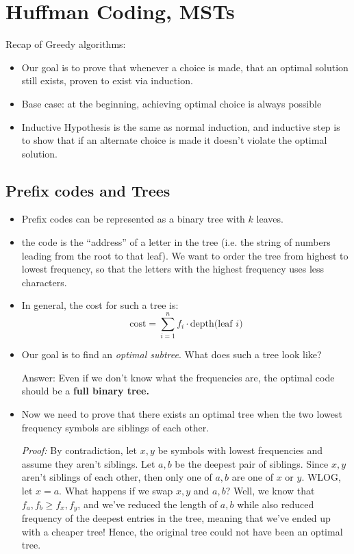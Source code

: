 \section{Huffman Coding, MSTs}
	Recap of Greedy algorithms:
	\begin{itemize}
		\item Our goal is to prove that whenever a choice is made, that an optimal solution still exists, proven
			to exist via induction.
		\item Base case: at the beginning, achieving optimal choice is always possible
		\item Inductive Hypothesis is the same as normal induction, and inductive step is to show that if 
			an alternate choice is made it doesn't violate the optimal solution.
	\end{itemize}
	\subsection{Prefix codes and Trees}
	\begin{itemize}
		\item Prefix codes can be represented as a binary tree with $k$ leaves. 
		\item the code is the ``address'' of a letter in the tree (i.e. the string of numbers leading from 
			the root to that leaf). We want to order the tree from highest to lowest frequency, so that the 
			letters with the highest frequency uses less characters.
		\item In general, the cost for such a tree is:
			\[
				\mathrm{cost} = \sum_{i = 1}^n f_i \cdot \text{depth(leaf $i$)}
			\] 
		\item Our goal is to find an \textit{optimal subtree}. What does such a tree look like? 

		Answer: Even if 
			we don't know what the frequencies are, the optimal code should be a \textbf{full binary tree.} 

		\item Now
			we need to prove that there exists an optimal tree when the
			two lowest frequency symbols are siblings 
			of each other.

			\textit{Proof:} By contradiction, let $x, y$ be symbols with lowest frequencies and assume they 
			aren't siblings. Let $a, b$ be the deepest pair of siblings. Since $x, y$ aren't siblings 
			of each other, then only one of $a, b$ are one of $x$ or $y$. WLOG, let $x = a$. 
			What happens if we swap $x,y$ and $a, b$? Well, we know that $f_a, f_b \ge f_x, f_y$, and we've 
			reduced the length of $a, b$ while also reduced frequency of the deepest entries in the tree, meaning
			that we've ended up with a cheaper tree! Hence, the original tree could not have 
			been an optimal tree. 
	\end{itemize}

